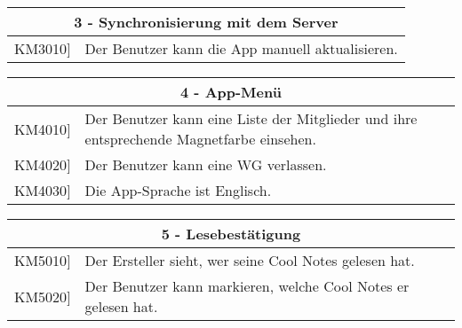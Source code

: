 \documentclass[a4paper]{scrreprt}
\begin{document}
    	\vspace{5mm}
    	
    	\begin{table}[h!]
    		\centering
    		\label{my-label}
    		\begin{tabular}{p{2cm}p{12cm}}
    			
    			\multicolumn{2}{c}{\textbf{3 - Synchronisierung mit dem Server}} \\ \hline
    			\centering{[}KM3010{]} & Der Benutzer kann die App manuell aktualisieren.\\
    			
    			\hline
    		\end{tabular}
    	\end{table}
    
    	\vspace{5mm}
    	
    	\begin{table}[h!]
    		\centering
    		\label{my-label}
    		\begin{tabular}{p{2cm}p{12cm}}
    			
    			\multicolumn{2}{c}{\textbf{4 - App-Menü}} \\ \hline
    			\centering{[}KM4010{]} & Der Benutzer kann eine Liste der Mitglieder und ihre entsprechende Magnetfarbe einsehen.\\
    			\centering{[}KM4020{]}& Der Benutzer kann eine WG verlassen.                               \\
    			\centering{[}KM4030{]}& Die App-Sprache ist Englisch.\\ 
    			
    			\hline
    		\end{tabular}
    	\end{table}
    
    	\vspace{5mm}
    	
    	\begin{table}[h!]
    		\centering
    		\label{my-label}
    		\begin{tabular}{p{2cm}p{12cm}}
    			
    			\multicolumn{2}{c}{\textbf{5 - Lesebestätigung}} \\ \hline
    			\centering{[}KM5010{]} & Der Ersteller sieht, wer seine Cool Notes gelesen hat.\\
    			\centering{[}KM5020{]}& Der Benutzer kann markieren, welche Cool Notes er gelesen hat.                               \\ 
    			
    			\hline
    		\end{tabular}
    	\end{table}
    
\end{document}
